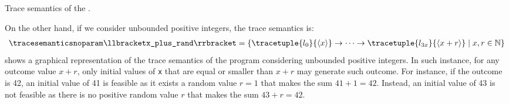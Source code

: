 \begin{example}
\begin{marginfigure}
\begin{tikzpicture}[scale=0.8]
\end{tikzpicture}
\caption{Trace semantics of the .}
\end{marginfigure}
On the other hand, if we consider unbounded positive integers, the trace semantics is:
\begin{align*}
  \tracesemanticsnoparam\semanticsof{\texttt{x\_plus\_rand}}
  =
  \setdef{
    \tracetuple{\locinit}{\langle{x}\rangle}\tracearrow\tracetuple{\loc{3x}}{\langle{x+r}\rangle}
  }{x, r \in \N}
\end{align*}
 shows a graphical representation of the trace semantics of the program  considering unbounded positive integers.
In such instance, for any outcome value $x+r$, only initial values of \texttt{x} that are equal or smaller than $x+r$ may generate such outcome.
For instance, if the outcome is 42, an initial value of 41 is feasible as it exists a random value $r = 1$ that makes the sum $41 + 1 = 42$. Instead, an initial value of 43 is not feasible as there is no positive random value $r$ that makes the sum $43 + r = 42$.

\end{example}

